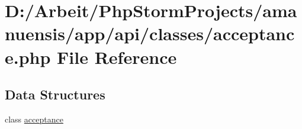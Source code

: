 \hypertarget{acceptance_8php}{}\section{D\+:/\+Arbeit/\+Php\+Storm\+Projects/amanuensis/app/api/classes/acceptance.php File Reference}
\label{acceptance_8php}
\subsection*{Data Structures}
\begin{DoxyCompactItemize}
\item 
class \hyperlink{classacceptance}{acceptance}
\end{DoxyCompactItemize}
